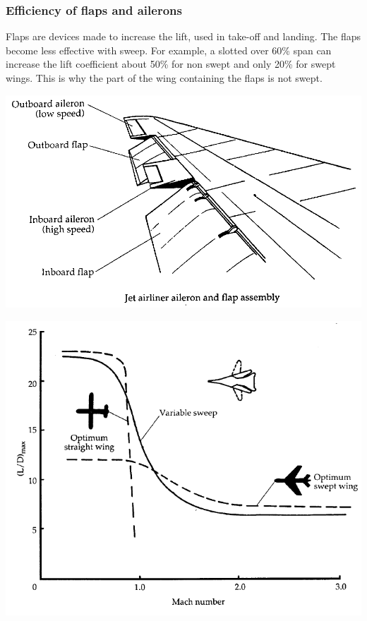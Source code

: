 \subsubsection{Efficiency of flaps and ailerons}
	Flaps are devices made to increase the lift, used in take-off and landing. The flaps become less effective with sweep. For example, a slotted over 60\% span can increase the lift coefficient about 50\% for non swept and only 20\% for swept wings. This is why the part of the wing containing the flaps is not swept.  
	
	\begin{center}
	\begin{minipage}{0.33\textwidth}
	\includegraphics[scale=0.15]{ch7/11}
	\label{ch7/11}
	\end{minipage}
	\begin{minipage}{0.25\textwidth}
	\includegraphics[scale=0.15]{ch7/12}

\end{minipage}
\end{center}
